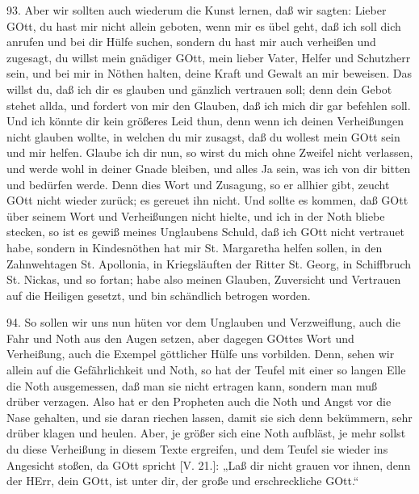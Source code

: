 93. Aber wir sollten auch wiederum die Kunst lernen, daß wir sagten: Lieber GOtt, du hast mir nicht allein geboten, wenn mir es übel geht, daß ich soll dich anrufen und bei dir Hülfe suchen, sondern du hast mir auch verheißen und zugesagt, du willst mein gnädiger GOtt, mein lieber Vater, Helfer und Schutzherr sein, und bei mir in Nöthen halten, deine Kraft und Gewalt an mir beweisen. Das willst du, daß ich dir es glauben und gänzlich vertrauen soll; denn dein Gebot stehet allda, und fordert von mir den Glauben, daß ich mich dir gar befehlen soll. Und ich könnte dir kein größeres Leid thun, denn wenn ich deinen Verheißungen nicht glauben wollte, in welchen du mir zusagst, daß du wollest mein GOtt sein und mir helfen. Glaube
ich dir nun, so wirst du mich ohne Zweifel nicht verlassen, und werde wohl in deiner Gnade bleiben, und alles Ja sein, was ich von dir bitten und bedürfen werde. Denn dies Wort und Zusagung, so er allhier gibt, zeucht GOtt nicht wieder zurück; es gereuet ihn nicht. Und sollte es kommen, daß GOtt über seinem Wort und Verheißungen nicht hielte, und ich in der Noth bliebe stecken, so ist es gewiß meines Unglaubens Schuld, daß ich GOtt nicht vertrauet habe, sondern in Kindesnöthen hat mir St. Margaretha helfen sollen, in den Zahnwehtagen St. Apollonia, in Kriegsläuften der Ritter St. Georg, in Schiffbruch St. Nickas, und so fortan; habe also meinen Glauben, Zuversicht und Vertrauen auf die Heiligen gesetzt, und bin schändlich betrogen worden.

94. So sollen wir uns nun hüten vor dem Unglauben und Verzweiflung, auch die Fahr und Noth aus den Augen setzen, aber dagegen GOttes Wort und Verheißung, auch die Exempel göttlicher Hülfe uns vorbilden. Denn, sehen wir allein auf die Gefährlichkeit und Noth, so hat der Teufel mit einer so langen Elle die Noth ausgemessen, daß man sie nicht ertragen kann, sondern man muß drüber verzagen. Also hat er den Propheten auch die Noth und Angst vor die Nase gehalten, und sie daran riechen lassen, damit sie sich denn bekümmern, sehr drüber klagen und heulen. Aber, je größer sich eine Noth aufbläst, je mehr sollst du diese Verheißung in diesem Texte ergreifen, und dem Teufel sie wieder ins Angesicht stoßen, da GOtt spricht [V. 21.]: „Laß dir nicht grauen vor ihnen, denn der HErr, dein GOtt, ist unter dir, der große und erschreckliche GOtt.“

